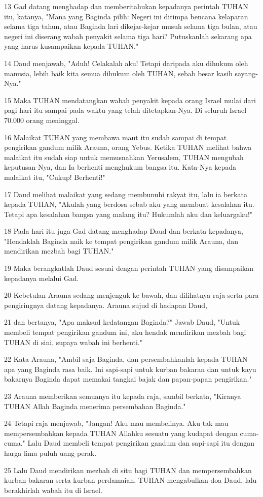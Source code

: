 \par 13 Gad datang menghadap dan memberitahukan kepadanya perintah TUHAN itu, katanya, "Mana yang Baginda pilih: Negeri ini ditimpa bencana kelaparan selama tiga tahun, atau Baginda lari dikejar-kejar musuh selama tiga bulan, atau negeri ini diserang wabah penyakit selama tiga hari? Putuskanlah sekarang apa yang harus kusampaikan kepada TUHAN."
\par 14 Daud menjawab, "Aduh! Celakalah aku! Tetapi daripada aku dihukum oleh manusia, lebih baik kita semua dihukum oleh TUHAN, sebab besar kasih sayang-Nya."
\par 15 Maka TUHAN mendatangkan wabah penyakit kepada orang Israel mulai dari pagi hari itu sampai pada waktu yang telah ditetapkan-Nya. Di seluruh Israel 70.000 orang meninggal.
\par 16 Malaikat TUHAN yang membawa maut itu sudah sampai di tempat pengirikan gandum milik Arauna, orang Yebus. Ketika TUHAN melihat bahwa malaikat itu sudah siap untuk memusnahkan Yerusalem, TUHAN mengubah keputusan-Nya, dan Ia berhenti menghukum bangsa itu. Kata-Nya kepada malaikat itu, "Cukup! Berhenti!"
\par 17 Daud melihat malaikat yang sedang membunuhi rakyat itu, lalu ia berkata kepada TUHAN, "Akulah yang berdosa sebab aku yang membuat kesalahan itu. Tetapi apa kesalahan bangsa yang malang itu? Hukumlah aku dan keluargaku!"
\par 18 Pada hari itu juga Gad datang menghadap Daud dan berkata kepadanya, "Hendaklah Baginda naik ke tempat pengirikan gandum milik Arauna, dan mendirikan mezbah bagi TUHAN."
\par 19 Maka berangkatlah Daud sesuai dengan perintah TUHAN yang disampaikan kepadanya melalui Gad.
\par 20 Kebetulan Arauna sedang menjenguk ke bawah, dan dilihatnya raja serta para pengiringnya datang kepadanya. Arauna sujud di hadapan Daud,
\par 21 dan bertanya, "Apa maksud kedatangan Baginda?" Jawab Daud, "Untuk membeli tempat pengirikan gandum ini, aku hendak mendirikan mezbah bagi TUHAN di sini, supaya wabah ini berhenti."
\par 22 Kata Arauna, "Ambil saja Baginda, dan persembahkanlah kepada TUHAN apa yang Baginda rasa baik. Ini sapi-sapi untuk kurban bakaran dan untuk kayu bakarnya Baginda dapat memakai tangkai bajak dan papan-papan pengirikan."
\par 23 Arauna memberikan semuanya itu kepada raja, sambil berkata, "Kiranya TUHAN Allah Baginda menerima persembahan Baginda."
\par 24 Tetapi raja menjawab, "Jangan! Aku mau membelinya. Aku tak mau mempersembahkan kepada TUHAN Allahku sesuatu yang kudapat dengan cuma-cuma." Lalu Daud membeli tempat pengirikan gandum dan sapi-sapi itu dengan harga lima puluh uang perak.
\par 25 Lalu Daud mendirikan mezbah di situ bagi TUHAN dan mempersembahkan kurban bakaran serta kurban perdamaian. TUHAN mengabulkan doa Daud, lalu berakhirlah wabah itu di Israel.


